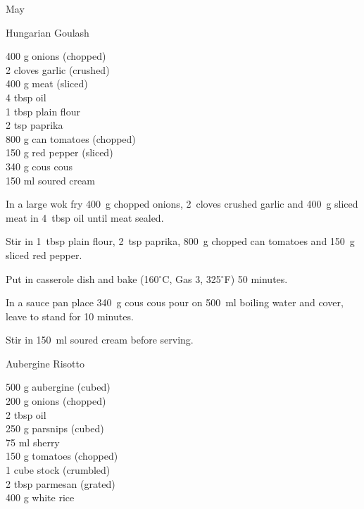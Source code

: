 \begin{menu}{May}
    \begin{recipe}{2}{Hungarian Goulash}%
		\begin{ingredients}
		400 g onions (chopped) \\
	2 cloves garlic (crushed) \\
	400 g meat (sliced) \\
	4 tbsp oil  \\
	1 tbsp plain flour  \\
	2 tsp paprika  \\
	800 g can tomatoes (chopped) \\
	150 g red pepper (sliced) \\
	340 g cous cous  \\
	150 ml soured cream  \\
	
		\end{ingredients}
	
	
    \begin{instructions}
    \item 
        In a large wok fry
        400~g chopped onions,
        2~cloves crushed garlic
        and
        400~g sliced meat
        in
        4~tbsp  oil
        until meat sealed.
      \item 
        Stir in
        1~tbsp  plain flour,
        2~tsp  paprika,
        800~g chopped can tomatoes
        and
        150~g sliced red pepper.
      \item 
        Put in casserole dish and bake (160$^{\circ}$C, Gas 3, 325$^{\circ}$F) 50 minutes.
      \item 
    In a
    sauce pan
    place
    340~g  cous cous
    pour on
    500~ml  boiling water
    and cover, leave to stand for 10 minutes.
  \item 
        Stir in
        150~ml  soured cream before serving.
      
    \end{instructions}
    \end{recipe}%
  
    \begin{recipe}{2}{Aubergine Risotto}%
		\begin{ingredients}
		500 g aubergine (cubed) \\
	200 g onions (chopped) \\
	2 tbsp oil  \\
	250 g parsnips (cubed) \\
	75 ml sherry  \\
	150 g tomatoes (chopped) \\
	1 cube stock (crumbled) \\
	2 tbsp parmesan (grated) \\
	400 g white rice  \\
	

\end{ingredients}
\end{recipe}
\end{menu}
